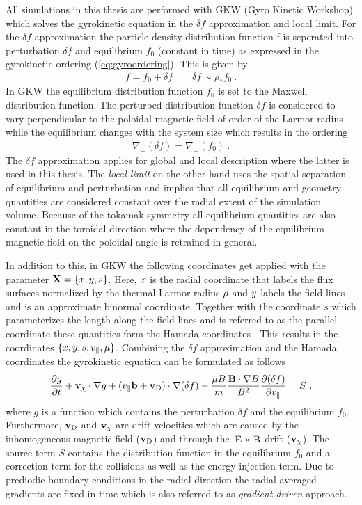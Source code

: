 All simulations in this thesis are performed with GKW (Gyro Kinetic Workshop) which solves the gyrokinetic equation in the $\delta f$ approximation and local limit. For the $\delta f$ approximation the particle density distribution function f is seperated into perturbation $\delta f$ and equilibrium $f_0$ (constant in time) as expressed in the gyrokinetic ordering (\ref{eq:gyroordering}). This is given by
\begin{gather}
	f = f_0 + \delta f \qquad \delta f \sim \rho_* f_0~.
\end{gather}
In GKW the equilibrium distribution function $f_0$ is set to the Maxwell distribution function. The perturbed distribution function $\delta f$ is considered to vary perpendicular to the poloidal magnetic field of order of the Larmor radius while the equilibrium changes with the system size which results in the ordering
\begin{gather}
	\nabla_\perp(\delta f) = \nabla_\perp (f_0)~.
\end{gather}
The $\delta f$ approximation applies for global and local description where the latter is used in this thesis.
The \textit{local limit} on the other hand uses the spatial separation of equilibrium and perturbation and implies that all equilibrium and geometry quantities are considered constant over the radial extent of the simulation volume. Because of the tokamak symmetry all equilibrium quantities are also constant in the toroidal direction where the dependency of the equilibrium magnetic field on the poloidal angle is retrained in general. \\\bigskip

In addition to this, in GKW the following coordinates get applied with the parameter $\boldsymbol{\mathbf{X}} = \{x, y, s\}$. Here, $x$ is the radial coordinate that labels the flux surfaces normalized by the thermal Larmor radius $\rho$ and $y$ labels the field lines and is an approximate binormal coordinate. Together with the coordinate $s$ which parameterizes the length along the field lines and is referred to as the parallel coordinate these quantities form the Hamada coordinates \cite{Hamada1958}. This results in the coordinates $\{x, y, s, v_\parallel, \mu\}$. Combining the $\delta f$ approximation and the Hamada coordinates the gyrokinetic equation can be formulated as follows
\begin{gather}
	\frac{\partial g}{\partial t} + \boldsymbol{\mathbf{v}}_\chi \cdot \nabla g + (v_\parallel \boldsymbol{\mathbf{b}} + \boldsymbol{\mathbf{v}}_\mathrm{D}) \cdot \nabla(\delta f) - \frac{\mu B}{m}\frac{\boldsymbol{\mathbf{B}}\cdot\nabla B}{B^2}\frac{\partial (\delta f)}{\partial v_\parallel} = S~,
\end{gather}
where $g$ is a function which contains the perturbation $\delta f$ and the equilibrium $f_0$. Furthermore, $\boldsymbol{\mathbf{v}}_\mathrm{D}$ and $\boldsymbol{\mathbf{v}}_\chi$ are drift velocities which are caused by the inhomogeneous magnetic field ($\boldsymbol{\mathbf{v}}_\mathrm{D}$) and through the $\mathrm{\:E}\times\mathrm{B}$ drift ($\boldsymbol{\mathbf{v}}_\chi$). The source term $S$ contains the distribution function in the equilibrium $f_0$ and a correction term for the collisions as well as the energy injection term. Due to prediodic boundary conditions in the radial direction the radial averaged gradients are fixed in time which is also referred to as \textit{gradient driven} approach. \cite{Peeters2009}